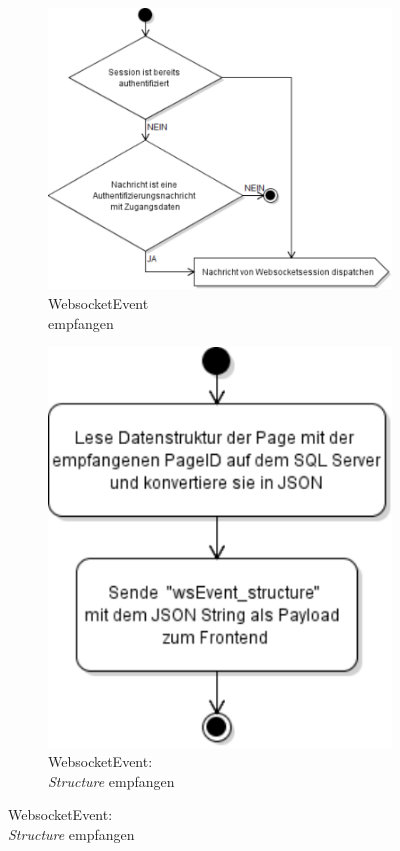 \begin{figure}[ht]
  \centering
  \begin{subfigure}[b]{0.66222973\textwidth}
    \centering
    \includegraphics[width=\textwidth]{content/hauptteil/systemEntwurf/res/wsHandler/backend/message_received.pdf}
    \caption{WebsocketEvent\\empfangen}
    \label{fig:aDDB:entry}
  \end{subfigure}
  \hfill
  \begin{subfigure}[b]{0.32777027\textwidth}
    \centering
    \includegraphics[width=\textwidth]{content/hauptteil/systemEntwurf/res/wsHandler/backend/wsEvent_structure.pdf}
    \caption{WebsocketEvent:\\\emph{Structure} empfangen}
    \label{fig:aDDB:wsEvent_structure}
  \end{subfigure}
  \hspace{50mm}


\end{figure}
